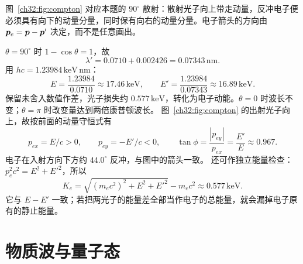 \begin{xesolution}
\begin{center}\begin{minipage}{\linewidth}\centering\raggedright\ModernAnswerLabel\par\smallskip\centering

\end{minipage}\end{center}
图~\ref{ch32:fig:compton} 对应本题的 $90^\circ$ 散射：散射光子向上带走动量，反冲电子便必须具有向下的动量分量，同时保有向右的动量分量。电子箭头的方向由 $\bm{p}_e=\bm{p}-\bm{p}'$ 决定，而不是任意画出。


$\theta=90^\circ$ 时 $1-\cos\theta=1$，故
\[
 \boxed{\lambda'=0.0710+0.002426=0.07343\,\mathrm{nm}}.
\]
用 $hc=1.23984\,\mathrm{keV\,nm}$：
\[
 E=\frac{1.23984}{0.0710}\approx17.46\,\mathrm{keV},
 \qquad
 E'=\frac{1.23984}{0.07343}\approx16.89\,\mathrm{keV}.
\]
保留未舍入数值作差，光子损失约 $0.577\,\mathrm{keV}$，转化为电子动能。$\theta=0$ 时波长不变；$\theta=\pi$ 时改变量达到两倍康普顿波长。
图~\ref{ch32:fig:compton} 的出射光子向上，故按前面的动量守恒式有
\[
 p_{ex}=E/c>0,\qquad p_{ey}=-E'/c<0,
 \qquad \tan\phi=\frac{|p_{ey}|}{p_{ex}}=\frac{E'}E\approx0.967.
\]
电子在入射方向下方约 $44.0^\circ$ 反冲，与图中的箭头一致。
还可作独立能量检查：$p_e^2c^2=E^2+E'^2$，所以
\[
 K_e=\sqrt{(m_ec^2)^2+E^2+E'^2}-m_ec^2\approx0.577\,\mathrm{keV}.
\]
它与 $E-E'$ 一致；若把两光子的能量差全部当作电子的总能量，就会漏掉电子原有的静止能量。
\end{xesolution}



\section{物质波与量子态}

